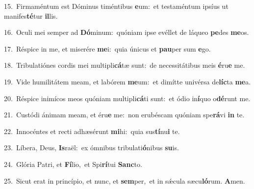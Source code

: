 {\numbfont\textcolor{\numbcolor}{15.}}~Firmaméntum est Dóminus timéntibus \textbf{e}\-um:~\star et testaméntum ipsíus ut manifes\-\textbf{té}\-tur \textbf{il}\-lis.\par
{\numbfont\textcolor{\numbcolor}{16.}}~Oculi mei semper ad \textbf{Dó}\-minum:~\star quóniam ipse evéllet de láqueo \textbf{pe}\-des \textbf{me}\-os.\par
{\numbfont\textcolor{\numbcolor}{17.}}~Réspice in me, et miserére \textbf{me}\-i:~\star quia únicus et \textbf{pau}\-per sum \textbf{e}\-go.\par
{\numbfont\textcolor{\numbcolor}{18.}}~Tribulatiónes cordis mei multipli\-\textbf{cá}\-tæ sunt:~\star de necessitátibus meis \textbf{é}\-ru\textbf{e} me.\par
{\numbfont\textcolor{\numbcolor}{19.}}~Vide humilitátem meam, et labórem \textbf{me}\-um:~\star et dimítte univérsa de\-\textbf{líc}\-ta \textbf{me}\-a.\par
{\numbfont\textcolor{\numbcolor}{20.}}~Réspice inimícos meos quóniam multipli\-\textbf{cá}\-ti sunt:~\star et ódio in\-\textbf{í}\-quo o\-\textbf{dé}\-runt me.\par
{\numbfont\textcolor{\numbcolor}{21.}}~Custódi ánimam meam, et éru\textbf{e} me:~\star non erubéscam quóniam spe\-\textbf{rá}\-vi \textbf{in} te.\par
{\numbfont\textcolor{\numbcolor}{22.}}~Innocéntes et recti adhæsérunt \textbf{mi}\-hi:~\star quia sus\-\textbf{tí}\-nu\textbf{i} te.\par
{\numbfont\textcolor{\numbcolor}{23.}}~Líbera, Deus, \textbf{Is}\-raël:~\star ex ómnibus tribulati\-\textbf{ó}\-nibus \textbf{su}\-is.\par
{\numbfont\textcolor{\numbcolor}{24.}}~Glória Patri, et \textbf{Fí}\-lio,~\star et Spi\-\textbf{rí}\-tui \textbf{Sanc}\-to.\par
{\numbfont\textcolor{\numbcolor}{25.}}~Sicut erat in princípio, et nunc, et \textbf{sem}\-per,~\star et in sǽcula sæcu\-\textbf{ló}\-rum. \textbf{A}\-men.\par
